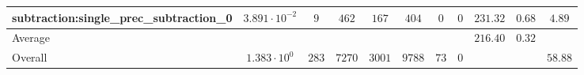 \begin{tabular}{|l|c|c|c|c|c|c|c|c|c|c|}
subtraction:single\_prec\_subtraction\_0         & $ 3.891 \cdot 10^{-2} $ & $ 9      $ & $ 462  $ & $ 167  $ & $ 404   $ & $ 0  $ & $ 0 $ & $ 231.32      $ & $ 0.68    $ & $ 4.89    $ \\
\hline
Average                                          & $                     $ & $        $ & $      $ & $      $ & $       $ & $    $ & $   $ & $ 216.40      $ & $ 0.32    $ & $         $ \\
\hline
Overall                                          & $ 1.383 \cdot 10^{0}  $ & $ 283    $ & $ 7270 $ & $ 3001 $ & $ 9788  $ & $ 73 $ & $ 0 $ & $             $ & $         $ & $ 58.88   $ \\
\hline
\end{tabular}
